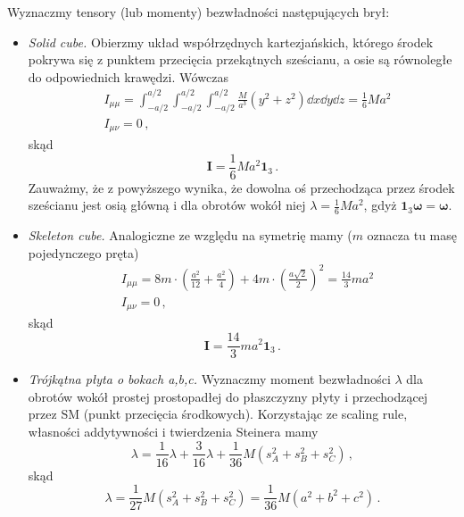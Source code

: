 \documentclass[../main.tex]{subfiles}
\begin{document}
Wyznaczmy tensory (lub momenty) bezwładności następujących brył:
\begin{itemize}
    \item \textit{Solid cube.} Obierzmy układ współrzędnych kartezjańskich, którego środek pokrywa
    się z punktem przecięcia przekątnych sześcianu, a osie są równoległe do odpowiednich krawędzi.
    Wówczas
    \begin{equation*}
        \begin{split}
            &I_{\mu\mu}=\int_{-a/2}^{a/2}\int_{-a/2}^{a/2}\int_{-a/2}^{a/2} \frac{M}{a^3} (y^2+z^2)\dd{x}\dd{y}\dd{z}=\frac{1}{6}Ma^2\\
            &I_{\mu\nu}=0\,,
        \end{split}
    \end{equation*}
    skąd
    \begin{equation*}
        \mathbf{I}=\frac{1}{6}Ma^2\mathbf{1}_3\,.
    \end{equation*}
    Zauważmy, że z powyższego wynika, że dowolna oś przechodząca przez środek sześcianu jest osią
    główną i dla obrotów wokół niej \(\lambda=\frac{1}{6}Ma^2\), gdyż
    \(\mathbf{1}_3\boldsymbol{\omega}=\boldsymbol{\omega}\).
    
    \item \textit{Skeleton cube.} Analogiczne ze względu na symetrię mamy (\(m\) oznacza tu masę
    pojedynczego pręta)
    \begin{equation*}
    \begin{split}
        &I_{\mu\mu}=8m\cdot\left(\frac{a^2}{12}+\frac{a^2}{4}\right)+4m\cdot\left(\frac{a\sqrt{2}}{2}\right)^2=\frac{14}{3}ma^2\\
        &I_{\mu\nu}=0\,,
    \end{split}
    \end{equation*}
    skąd
    \begin{equation*}
        \mathbf{I}=\frac{14}{3}ma^2\mathbf{1}_3\,.
    \end{equation*}
    \item \textit{Trójkątna płyta o bokach a,b,c.} Wyznaczmy moment bezwładności \(\lambda\) dla
    obrotów wokół prostej prostopadłej do płaszczyzny płyty i przechodzącej przez SM (punkt
    przecięcia środkowych). Korzystając ze scaling rule, własności addytywności i twierdzenia
    Steinera mamy
    \begin{equation*}
        \lambda=\frac{1}{16}\lambda+\frac{3}{16}\lambda+\frac{1}{36}M(s_A^2+s_B^2+s_C^2)\,,
    \end{equation*}
    skąd
    \begin{equation*}
        \lambda=\frac{1}{27}M(s_A^2+s_B^2+s_C^2)=\frac{1}{36}M(a^2+b^2+c^2)\,.
    \end{equation*}
\end{itemize}
\end{document}
